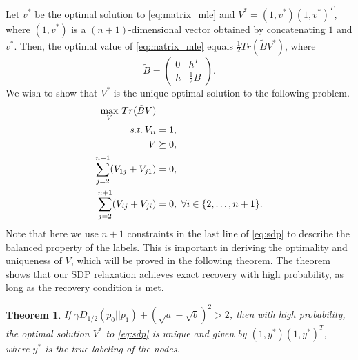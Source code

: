\documentclass[conference]{IEEEtran}
\newtheorem{theorem}{Theorem}
\begin{document}
	Let $v^*$ be the optimal solution to \eqref{eq:matrix_mle} and $V^*=(1,v^*)(1,v^*)^T$, where $(1,v^*)$ is a $(n+1)$-dimensional  vector obtained by concatenating $1$ and $v^*$.
	Then, the optimal value of \eqref{eq:matrix_mle} equals $\frac{1}{2}Tr(\widetilde{B}V^*)$, where
	\begin{equation}\label{eq:B_lambda_def}
		\widetilde{B} = \begin{pmatrix} 0 & h^T  \\ h  & \frac{1}{2}B \end{pmatrix}.
	\end{equation}
	We wish to show that $V^*$ is the unique optimal solution to the following problem.
	\begin{align}
		\max_V\, Tr(\tilde{B}V)  &\notag\\
		s.t.\, V_{ii} &= 1, \notag\\
		V &\succeq 0, \notag\\
		\sum_{j=2}^{n+1} (V_{1j} + V_{j1})& = 0,\notag\\
		\sum_{j=2}^{n+1} (V_{ij} + V_{ji})& = 0,~\forall i\in\{2,\ldots,n+1\}. \label{eq:sdp}
	\end{align}
	Note that here we use $n+1$ constraints in the last line of \eqref{eq:sdp} to describe the balanced property of the labels. This is important in deriving the optimality and uniqueness of $V$, which will be proved in the following theorem. The theorem shows that our SDP relaxation achieves exact recovery with high probability, as long as the recovery condition is met.
	\begin{theorem}\label{thm:sdp}
		If $\gamma D_{1/2}(p_0||p_1)  + (\sqrt{a} - \sqrt{b})^2 > 2$, then with high probability, the optimal solution
		$V^*$ to \eqref{eq:sdp} is unique and given by $(1,y^*)(1,y^*)^T$, where $y^*$ is the true labeling of the nodes.
	\end{theorem}
\end{document}
